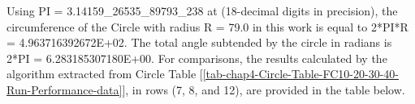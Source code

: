 Using PI = 3.14159\_26535\_89793\_238 at (18-decimal digits in precision), the circumference of the Circle with radius R = 79.0 in this work is equal to 2*PI*R = 4.963716392672E+02. The total angle subtended by the circle in radians is 2*PI = 6.283185307180E+00. For comparisons, the results calculated by the algorithm extracted from Circle Table [\ref  {tab-chap4-Circle-Table-FC10-20-30-40-Run-Performance-data}], in rows (7, 8, and 12), are provided in the table below.

\begin{table}[ht]
\caption          {Circle - Algorithm Validation and Verification}
\label  {tab-chap4-Circle - Algorithm Validation and Verification}
\scalebox{0.90}{
		
		
}
\end{table}
